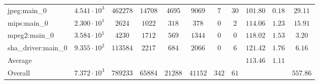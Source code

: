 \begin{tabular}{|l|c|c|c|c|c|c|c|c|c|c|}
jpeg:main\_0            & $ 4.541 \cdot 10^{3}  $ & $ 462278 $ & $ 14708 $ & $ 4695  $ & $ 9069  $ & $ 7   $ & $ 30 $ & $ 101.80      $ & $ 0.18    $ & $ 29.11   $ \\
mips:main\_0            & $ 2.300 \cdot 10^{1}  $ & $ 2624   $ & $ 1022  $ & $ 318   $ & $ 378   $ & $ 0   $ & $ 2  $ & $ 114.06      $ & $ 1.23    $ & $ 15.91   $ \\
mpeg2:main\_0           & $ 3.584 \cdot 10^{1}  $ & $ 4230   $ & $ 1712  $ & $ 569   $ & $ 1344  $ & $ 0   $ & $ 0  $ & $ 118.02      $ & $ 1.53    $ & $ 3.20    $ \\
sha\_driver:main\_0     & $ 9.355 \cdot 10^{2}  $ & $ 113584 $ & $ 2217  $ & $ 684   $ & $ 2066  $ & $ 0   $ & $ 6  $ & $ 121.42      $ & $ 1.76    $ & $ 6.16    $ \\
\hline
Average                 & $                     $ & $        $ & $       $ & $       $ & $       $ & $     $ & $    $ & $ 113.46      $ & $ 1.11    $ & $         $ \\
\hline
Overall                 & $ 7.372 \cdot 10^{3}  $ & $ 789233 $ & $ 65884 $ & $ 21288 $ & $ 41152 $ & $ 342 $ & $ 61 $ & $             $ & $         $ & $ 557.86  $ \\
\hline
\end{tabular}
